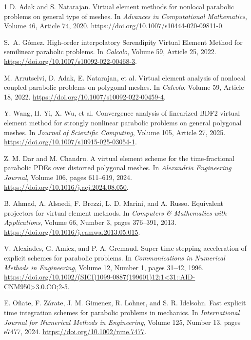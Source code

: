 \documentclass{article}
\begin{document}
\begin{thebibliography}{1}
D. Adak and S. Natarajan.
\newblock Virtual element methods for nonlocal parabolic problems on general type of meshes.
\newblock In {\em Advances in Computational Mathematics}, Volume 46, Article 74, 2020.
\newblock \url{https://doi.org/10.1007/s10444-020-09811-0}.

S.~A. G\'{o}mez.
\newblock High-order interpolatory Serendipity Virtual Element Method for semilinear parabolic problems.
\newblock In {\em Calcolo}, Volume 59, Article 25, 2022.
\newblock \url{https://doi.org/10.1007/s10092-022-00468-3}.



M. Arrutselvi, D. Adak, E. Natarajan, et al.
\newblock Virtual element analysis of nonlocal coupled parabolic problems on polygonal meshes.
\newblock In {\em Calcolo}, Volume 59, Article 18, 2022.
\newblock \url{https://doi.org/10.1007/s10092-022-00459-4}.

Y. Wang, H. Yi, X. Wu, et al.
\newblock Convergence analysis of linearized BDF2 virtual element method for strongly nonlinear parabolic problems on general polygonal meshes.
\newblock In {\em Journal of Scientific Computing}, Volume 105, Article 27, 2025.
\newblock \url{https://doi.org/10.1007/s10915-025-03054-1}.

Z. M. Dar and M. Chandru.
\newblock A virtual element scheme for the time-fractional parabolic PDEs over distorted polygonal meshes.
\newblock In {\em Alexandria Engineering Journal}, Volume 106, pages 611--619, 2024.
\newblock \url{https://doi.org/10.1016/j.aej.2024.08.050}.

B. Ahmad, A. Alsaedi, F. Brezzi, L. D. Marini, and A. Russo.
\newblock Equivalent projectors for virtual element methods.
\newblock In {\em Computers \& Mathematics with Applications}, Volume 66, Number 3, pages 376--391, 2013.
\newblock \url{https://doi.org/10.1016/j.camwa.2013.05.015}.


V. Alexiades, G. Amiez, and P.-A. Gremaud.
\newblock Super-time-stepping acceleration of explicit schemes for parabolic problems.
\newblock In {\em Communications in Numerical Methods in Engineering}, Volume 12, Number 1, pages 31--42, 1996.
\newblock \url{https://doi.org/10.1002/(SICI)1099-0887(199601)12:1<31::AID-CNM950>3.0.CO;2-5}.

E. Oñate, F. Zárate, J. M. Gimenez, R. Lohner, and S. R. Idelsohn.
\newblock Fast explicit time integration schemes for parabolic problems in mechanics.
\newblock In {\em International Journal for Numerical Methods in Engineering}, Volume 125, Number 13, pages e7477, 2024.
\newblock \url{https://doi.org/10.1002/nme.7477}.


\end{thebibliography}
\end{document}
